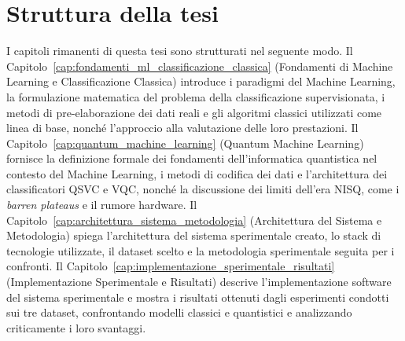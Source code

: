 \section*{Struttura della tesi}

I capitoli rimanenti di questa tesi sono strutturati nel seguente modo. Il Capitolo~\ref{cap:fondamenti_ml_classificazione_classica} (Fondamenti di Machine Learning e Classificazione Classica) introduce i paradigmi del Machine Learning, la formulazione matematica del problema della classificazione supervisionata, i metodi di pre-elaborazione dei dati reali e gli algoritmi classici utilizzati come linea di base, nonché l'approccio alla valutazione delle loro prestazioni.
Il Capitolo~\ref{cap:quantum_machine_learning} (Quantum Machine Learning) fornisce la definizione formale dei fondamenti dell'informatica quantistica nel contesto del Machine Learning, i metodi di codifica dei dati e l'architettura dei classificatori QSVC e VQC, nonché la discussione dei limiti dell'era NISQ, come i \textit{barren plateaus} e il rumore hardware.
Il Capitolo~\ref{cap:architettura_sistema_metodologia} (Architettura del Sistema e Metodologia) spiega l'architettura del sistema sperimentale creato, lo stack di tecnologie utilizzate, il dataset scelto e la metodologia sperimentale seguita per i confronti.
Il Capitolo~\ref{cap:implementazione_sperimentale_risultati} (Implementazione Sperimentale e Risultati) descrive l'implementazione software del sistema sperimentale e mostra i risultati ottenuti dagli esperimenti condotti sui tre dataset, confrontando modelli classici e quantistici e analizzando criticamente i loro svantaggi.
